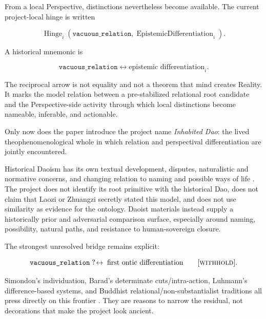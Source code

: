 \documentclass[11pt]{article}
\newcommand{\withhold}{\textsc{withhold}\xspace}
\begin{document}
From a local Perspective, distinctions nevertheless become available. The current project-local hinge is written

\begin{equation}
\operatorname{Hinge}_i(\texttt{vacuous\_relation},\operatorname{EpistemicDifferentiation}_i).
\end{equation}

A historical mnemonic is

\begin{equation}
\texttt{vacuous\_relation}\leftrightarrow \text{epistemic differentiation}_i.
\end{equation}

The reciprocal arrow is not equality and not a theorem that mind creates Reality. It marks the model relation between a pre-stabilized relational root candidate and the Perspective-side activity through which local distinctions become nameable, inferable, and actionable.

Only now does the paper introduce the project name \emph{Inhabited Dao}: the lived theophenomenological whole in which relation and perspectival differentiation are jointly encountered.

Historical Daoism has its own textual development, disputes, naturalistic and normative concerns, and changing relation to naming and possible ways of life \cite{Hansen2025Daoism,SEPChineseMetaphysics2023,Wang2013Yinyang}. The project does not identify its root primitive with the historical Dao, does not claim that Laozi or Zhuangzi secretly stated this model, and does not use similarity as evidence for the ontology. Daoist materials instead supply a historically prior and adversarial comparison surface, especially around naming, possibility, natural paths, and resistance to human-sovereign closure.

The strongest unresolved bridge remains explicit:

\begin{equation}
\texttt{vacuous\_relation}\;?\!\leftrightarrow\;\text{first ontic differentiation}
\qquad[\withhold].
\end{equation}

Simondon's individuation, Barad's determinate cuts/intra-action, Luhmann's difference-based systems, and Buddhist relational/non-substantialist traditions all press directly on this frontier \cite{Simondon2020Individuation,Barad2007,Luhmann2006Difference,SEPBuddha2024}. They are reasons to narrow the residual, not decorations that make the project look ancient.
\end{document}
